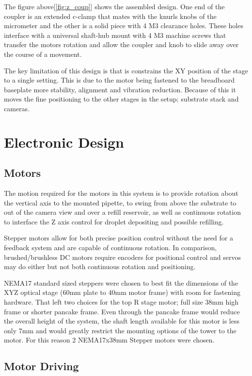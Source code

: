The figure above[\ref{fig:z_coup}] shows the assembled design. One end of the coupler is an extended c-clamp that mates with the knurls knobs of the micrometer and the other is a solid piece with 4 M3 clearance holes. These holes interface with a universal shaft-hub mount with 4 M3 machine screws that transfer the motors rotation and allow the coupler and knob to slide away over the course of a movement.

The key limitation of this design is that is constrains the XY position of the stage to a single setting. This is due to the motor being fastened to the breadboard baseplate more stability, alignment and vibration reduction. Because of this it moves the fine positioning to the other stages in the setup; substrate stack and cameras. 

\section{Electronic Design}

\subsection{Motors}
The motion required for the motors in this system is to provide rotation about the vertical axis to the mounted pipette, to swing from above the substrate to out of the camera view and over a refill reservoir, as well as continuous rotation to interface the Z axis control for droplet depositing and possible refilling.

Stepper motors allow for both precise position control without the need for a feedback system and are capable of continuous rotation. In comparison, brushed/brushless DC motors require encoders for positional control and servos may do either but not both continuous rotation and positioning.

NEMA17 standard sized steppers were chosen to best fit the dimensions of the XYZ optical stage (60mm plate to 40mm motor frame) with room for fastening hardware. That left two choices for the top R stage motor; full size 38mm high frame or shorter pancake frame. Even through the pancake frame would reduce the overall height of the system, the shaft length available for this motor is less only 7mm and would greatly restrict the mounting options of the tower to the motor. For this reason 2 NEMA17x38mm Stepper motors were chosen.

\subsection{Motor Driving}

